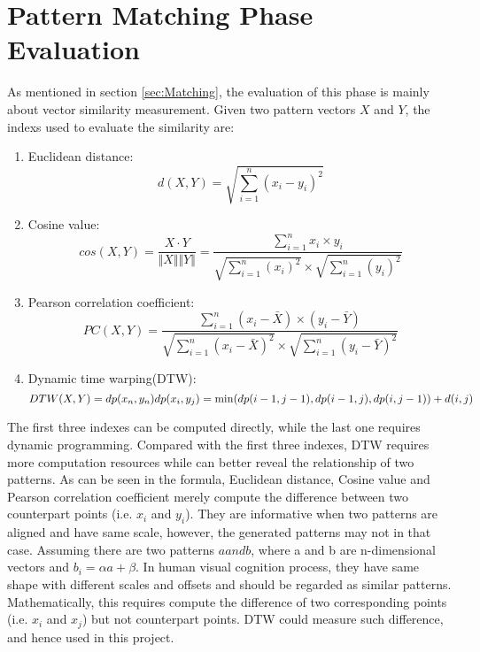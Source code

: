 \section{Pattern Matching Phase Evaluation}
As mentioned in section \ref{sec:Matching}, the evaluation of this phase is mainly about vector similarity measurement. Given two pattern vectors $X$ and $Y$, the indexs used to evaluate the similarity are:
\begin{enumerate}
    \item Euclidean distance:
    \begin{equation}
        d(X,Y) = \sqrt{\sum_{i=1}^n (x_i - y_i)^2}
    \end{equation}
    \item Cosine value: 
    \begin{equation}
        cos(X,Y) = \frac{X \cdot Y}{\Vert X \Vert \Vert Y \Vert} = \frac{\sum_{i=1}^n x_i \times y_i}{\sqrt{\sum_{i=1}^n(x_i)^2} \times \sqrt{\sum_{i=1}^n(y_i)^2}}
    \end{equation}
    \item Pearson correlation coefficient:
    \begin{equation}
        PC(X,Y) = \frac{\sum_{i=1}^n (x_i - \bar{X}) \times (y_i - \bar{Y}) }{ \sqrt{\sum_{i=1}^n (x_i - \bar{X}) ^2} \times\sqrt{\sum_{i=1}^n (y_i - \bar{Y}) ^2}}
    \end{equation}
    \item Dynamic time warping(DTW): 
    \begin{equation}
        DTW(X,Y) = dp(x_n, y_n) \\
        dp(x_i, y_j) = \min(dp(i-1, j-1), dp(i-1, j), dp(i,j-1)) + d(i,j)
    \end{equation}
\end{enumerate}
The first three indexes can be computed directly, while the last one requires dynamic programming. Compared with the first three indexes, DTW requires more computation resources while can better reveal the relationship of two patterns. As can be seen in the formula, Euclidean distance, Cosine value and Pearson correlation coefficient merely compute the difference between two counterpart points (i.e. $x_i$ and $y_i$). They are informative when two patterns are aligned and have same scale, however, the generated patterns may not in that case. Assuming there are two patterns $a and b$, where a and b are n-dimensional vectors and $b_i = \alpha a + \beta$. In human visual cognition process, they have same shape with different scales and offsets and should be regarded as similar patterns. Mathematically, this requires compute the difference of two corresponding points (i.e. $x_i$ and $x_j$) but not counterpart points. DTW could measure such difference, and hence used in this project.  
